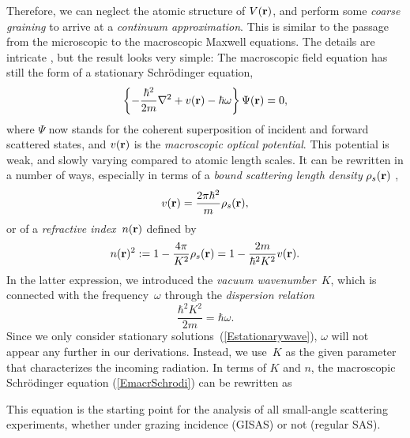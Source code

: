 Therefore,
we can neglect the atomic structure of $V(\mathbf{r})$,
and perform some \textit{coarse graining} to
arrive at a \textit{continuum approximation}.%
This is 
similar to the passage from
the microscopic to the macroscopic Maxwell equations.
The details are intricate \cite{Sea89,Lax51},
but the result \cite[eq.~2.8.32]{Sea89} looks very simple:
The macroscopic field equation
has still the form of a stationary Schrödinger equation,
\begin{equation}\label{EmacrSchrodi}
  \left\{-\frac{\hbar^2}{2m}\mathbf{\nabla}^2+v(\mathbf{r})-\hbar\omega\right\} \Psi(\mathbf{r}) = 0,
\end{equation}
where $\Psi$ now stands for the coherent superposition of
incident and forward scattered states,
and $v(\mathbf{r})$ is the \textit{macroscopic optical potential}.%
This potential is weak, and slowly varying compared to atomic length scales.
It can be rewritten in a number of ways,
especially in terms of a
\textit{bound scattering length density}%
$\rho_s(\mathbf{r})$ \cite[eq.\ 2.8.37]{Sea89},
\begin{equation}
  v(\mathbf{r})=\frac{2\pi \hbar^2}{m}\rho_s(\mathbf{r}),  
\end{equation}
or of a \textit{refractive index}~$n(\mathbf{r})$%
defined by
\begin{equation}\label{EnRefrIndx}
  n(\mathbf{r})^2:=1-\frac{4\pi}{K^2}\rho_s(\mathbf{r}) = 1 -\frac{2m}{\hbar^2 K^2}v(\mathbf{r}).
\end{equation}
In the latter expression,
we introduced the \textit{vacuum wavenumber}~$K$,
which is connected with the frequency~$\omega$ through the
\textit{dispersion relation}
\begin{equation}
  \frac{\hbar^2 K^2}{2m} = \hbar\omega.
\end{equation}
Since we only consider stationary solutions~(\ref{Estationarywave}),
$\omega$ will not appear any further in our derivations.
Instead, we use~$K$ as the given parameter that characterizes the
incoming radiation.
In terms of $K$ and $n$,
the macroscopic Schrödinger equation (\ref{EmacrSchrodi})
can be rewritten as

This equation is the starting point for the analysis of all
small-angle scattering experiments,
whether under grazing incidence (GISAS) or not (regular SAS).


